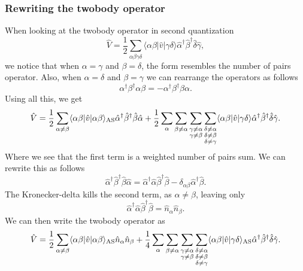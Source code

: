 \documentclass[a4paper, 11pt, notitlepage, english]{article}
\newcommand{\op}[1]{\hat{#1}}
\newcommand{\braopket}[3]{\langle #1 | {#2} | #3 \rangle}
\begin{document}
\subsubsection*{Rewriting the twobody operator}
When looking at the twobody operator in second quantization
$$\op{V} = \frac{1}{2}\sum_{\alpha\beta\gamma\delta}\braopket{\alpha\beta}{\op{v}}{\gamma\delta}\op{\alpha}^\dag\op{\beta}^\dag \op{\delta}\op{\gamma},$$
we notice that when $\alpha=\gamma$ and $\beta=\delta$, the form resembles the number of pairs operator. Also, when $\alpha=\delta$ and $\beta=\gamma$ we can rearrange the operators as follows
$$\alpha^\dagger\beta^\dagger\alpha \beta = -\alpha^\dagger\beta^\dagger \beta\alpha.$$
Using all this, we get
$$\op{V} = \frac{1}{2}\sum_{\alpha \neq \beta} \braopket{\alpha\beta}{\op{v}}{\alpha\beta}_{\rm AS}\op{\alpha}^\dag\op{\beta}^\dag\op{\beta}\op{\alpha} + \frac{1}{2}\sum_{\alpha}\sum_{\beta\neq\alpha}\sum_{\substack{\gamma\neq\alpha \\ \gamma \neq\beta}}\sum_{\substack{\delta\neq\alpha \\\delta\neq\beta\\ \delta \neq \gamma}} \braopket{\alpha\beta}{\op{v}}{\gamma\delta}\op{\alpha}^\dag\op{\beta}^\dag \op{\delta}\op{\gamma} .$$
Where we see that the first term is a weighted number of pairs sum. We can rewrite this as follows
$$\op{\alpha}^\dag\op{\beta}^\dag \op{\beta} \op{\alpha} = \op{\alpha}^\dag \op{\alpha}\op{\beta}^\dag\op{\beta} - \delta_{\alpha\beta}\op{\alpha}^\dag\op{\beta}.$$
The Kronecker-delta kills the second term, as $\alpha\neq\beta$, leaving only
$$\op{\alpha}^\dag\op{\alpha} \op{\beta}^\dag \op{\beta} = \op{n}_\alpha \op{n}_\beta.$$
We can then write the twobody operator as
$$\op{V} = \frac{1}{2}\sum_{\alpha \neq \beta} \braopket{\alpha\beta}{\op{v}}{\alpha\beta}_{\rm AS}\op{n}_\alpha \op{n}_\beta + \frac{1}{4}\sum_{\alpha}\sum_{\beta\neq\alpha}\sum_{\substack{\gamma\neq\alpha \\ \gamma \neq\beta}}\sum_{\substack{\delta\neq\alpha \\\delta\neq\beta\\ \delta \neq \gamma}} \braopket{\alpha\beta}{\op{v}}{\gamma\delta}_{\rm AS}\op{\alpha}^\dag\op{\beta}^\dag \op{\delta}\op{\gamma} .$$
\end{document}
